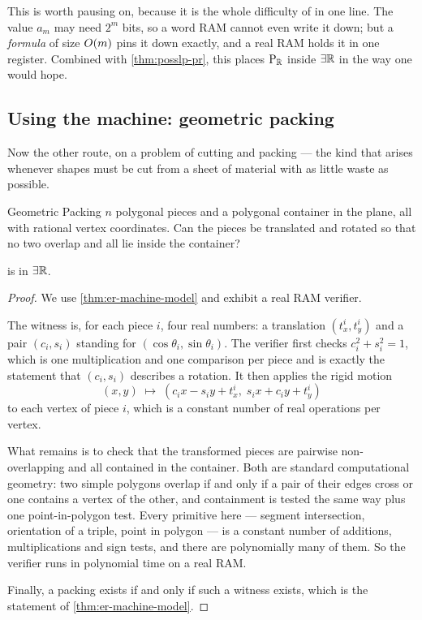 \begin{intuition}
This is worth pausing on, because it is the whole difficulty of 
in one line. The value $a_m$ may need $2^m$ bits, so a word RAM cannot even
write it down; but a \emph{formula} of size $O\!\left(m\right)$ pins it down exactly,
and a real RAM holds it in one register. Combined with
\cref{thm:posslp-pr}, this places $\mathrm{P}_{\mathbb{R}}$ inside $\exists\mathbb{R}$ in the way one
would hope.
\end{intuition}

\subsection{Using the machine: geometric packing}
\label{sec:er-membership-packing}

Now the other route, on a problem of cutting and packing --- the kind that
arises whenever shapes must be cut from a sheet of material with as little
waste as possible.

\begin{probdef}{Geometric Packing}
  \instance $n$ polygonal pieces and a polygonal container in the plane, all
  with rational vertex coordinates.
  \question Can the pieces be translated and rotated so that no two overlap and
  all lie inside the container?
\end{probdef}

\begin{proposition}\label{prop:er-packing}
 is in $\exists\mathbb{R}$.
\end{proposition}

\begin{proof}
We use \cref{thm:er-machine-model} and exhibit a real RAM verifier.

The witness is, for each piece $i$, four real numbers: a translation
$(t_x^i, t_y^i)$ and a pair $(c_i, s_i)$ standing for
$(\cos\theta_i, \sin\theta_i)$. The verifier first checks
$c_i^2 + s_i^2 = 1$, which is one multiplication and one comparison per piece
and is exactly the statement that $(c_i,s_i)$ describes a rotation. It then
applies the rigid motion
\[ (x,y) \;\longmapsto\; (c_i x - s_i y + t_x^i,\; s_i x + c_i y + t_y^i) \]
to each vertex of piece $i$, which is a constant number of real operations per
vertex.

What remains is to check that the transformed pieces are pairwise
non-overlapping and all contained in the container. Both are standard
computational geometry: two simple polygons overlap if and only if a pair of
their edges cross or one contains a vertex of the other, and containment is
tested the same way plus one point-in-polygon test. Every primitive here ---
segment intersection, orientation of a triple, point in polygon --- is a
constant number of additions, multiplications and sign tests, and there are
polynomially many of them. So the verifier runs in polynomial time on a real
RAM.

Finally, a packing exists if and only if such a witness exists, which is the
statement of \cref{thm:er-machine-model}.
\end{proof}

